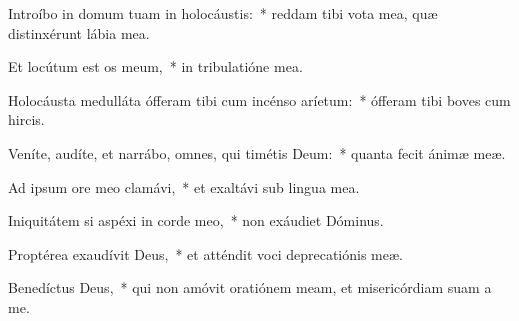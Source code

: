
\item Introíbo in domum tuam in holocáustis:~* reddam tibi vota mea, quæ distinxérunt lábia mea.

\item Et locútum est os meum,~* in tribulatióne mea.

\item Holocáusta medulláta ófferam tibi cum incénso aríetum:~* ófferam tibi boves cum hircis.

\item Veníte, audíte, et narrábo, omnes, qui timétis Deum:~* quanta fecit ánimæ meæ.

\item Ad ipsum ore meo clamávi,~* et exaltávi sub lingua mea.

\item Iniquitátem si aspéxi in corde meo,~* non exáudiet Dóminus.

\item Proptérea exaudívit Deus,~* et atténdit voci deprecatiónis meæ.

\item Benedíctus Deus,~* qui non amóvit oratiónem meam, et misericórdiam suam a me.